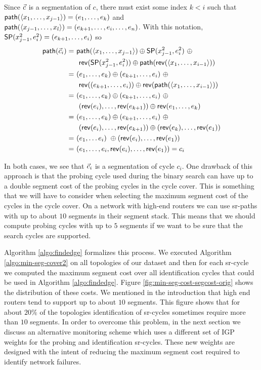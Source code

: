Since $\sr{c}$ is a segmentation of $c$, there must
exist some index $k < i$ such that $\seq(\langle x_1, \ldots, x_{j - 1} \rangle) = (e_1, \ldots, e_k)$
and $\seq(\langle x_{j - 1}, \ldots, x_l \rangle) = (e_{k + 1}, \ldots, e_i, \ldots, e_n)$. With this notation,
$\sp(x^2_{j - 1}, e^2_i) = (e_{k + 1}, \ldots, e_i)$ so
\begin{align*}
\seq(\sr{c}_i) = \ & \seq(\langle x_1, \ldots, x_{j - 1} \rangle) \oplus \sp(x^2_{j - 1}, e^2_i) \ \oplus \\
& \ \rev(\sp(x^2_{j - 1}, e^2_i)) \oplus \seq(\rev( \langle x_1, \ldots, x_{i - 1} \rangle )) \\
= \ & (e_1, \ldots, e_k) \oplus (e_{k + 1}, \ldots, e_i) \ \oplus \\
& \ \rev((e_{k + 1}, \ldots, e_i)) \oplus  \rev(\seq( \langle x_1, \ldots, x_{i - 1} \rangle )) \\
= \ & (e_1, \ldots, e_k) \oplus (e_{k + 1}, \ldots, e_i) \ \oplus \\
& \ (\rev(e_{i}), \ldots, \rev(e_{k + 1})) \oplus  \rev(e_1, \ldots, e_k) \\
= \ & (e_1, \ldots, e_k) \oplus (e_{k + 1}, \ldots, e_i) \ \oplus \\
& \ (\rev(e_{i}), \ldots, \rev(e_{k + 1})) \oplus  (\rev(e_k), \ldots, \rev(e_1)) \\
= \ & (e_1, \ldots e_i) \ \oplus (\rev(e_{i}), \ldots, \rev(e_1)) \\
= \ & (e_1, \ldots, e_i, \rev(e_{i}), \ldots, \rev(e_1)) = c_i
\end{align*}

In both cases, we see that $\sr{c}_i$ is a segmentation of cycle $c_i$. One drawback of this approach is that the probing cycle used during the binary
search can have up to a double segment cost of the probing cycles in the cycle cover. This is something that we will have to consider when selecting
the maximum segment cost of the cycles in the cycle cover. On a network with high-end routers we can use sr-paths with up to about $10$ segments in their
segment stack. This means that we should compute probing cycles with up to $5$ segments if we want to be sure that the search cycles are supported.

Algorithm \ref{algo:findedge} formalizes this process. We executed Algorithm \ref{algo:min-seg-cover2} on all topologies of our dataset and
then for each sr-cycle we computed the maximum segment cost over all identification cycles that could  be used in
Algorithm \ref{algo:findedge}. Figure \ref{fig:min-seg-cost-segcost-orig} shows the distribution of these costs. We mentioned in the introduction that high end routers
tend to support up to about $10$ segments. This figure shows that for about $20\%$ of the topologies identification of sr-cycles sometimes require more than
$10$ segments. In order to overcome this problem, in the next section we discuss an alternative monitoring scheme which uses a different set of IGP weights
for the probing and identification sr-cycles. These new weights are designed with the intent of reducing the maximum segment cost required to identify 
network failures.


